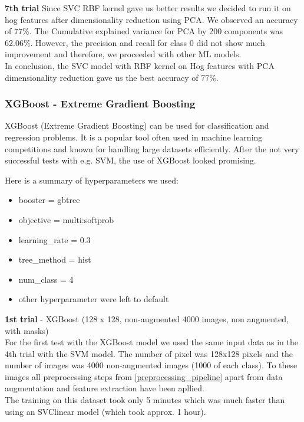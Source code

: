 \documentclass{article}
\begin{document}
\textbf{7th trial }Since SVC\- RBF kernel gave us better results we decided to run it on hog features after dimensionality reduction using PCA. We observed an accuracy of 77\%. The Cumulative explained variance for PCA by 200 components was 62.06\%. However, the precision and recall for class 0 did not show much improvement and therefore, we proceeded with other ML models.\\


In conclusion, the SVC model with RBF kernel on Hog features with PCA dimensionality reduction gave us the best accuracy of 77\%.

\subsubsection{XGBoost - Extreme Gradient Boosting}
XGBoost (Extreme Gradient Boosting) can be used for classification and regression problems. It is a popular tool often used in machine learning 
competitions and  known  for handling large datasets efficiently. After the not very successful tests with e.g. SVM, the use of XGBoost looked promising.

Here is a summary of hyperparameters we used: 

\begin{itemize}
    \item booster = gbtree
    \item  objective = multi:softprob
    \item learning\_rate = 0.3
    \item tree\_method = hist
    \item num\_class = 4
    \item other hyperparameter were left to default
\end{itemize}

\textbf{1st trial} - XGBoost (128 x 128, non-augmented 4000 images, non augmented, with masks) \\
For the first test with the XGBoost model we used the same input data as in the 4th trial with the SVM model. The number of pixel was 128x128 pixels and the number 
of images was 4000 non-augmented images (1000 of each class). To these images all preprocessing steps from \ref{preprocessing_pipeline} apart from data 
augmentation and feature extraction have been apllied.\\
The training on this dataset took only 5 minutes which was much faster than using an SVClinear model (which took approx. 1 hour).\\
\end{document}
